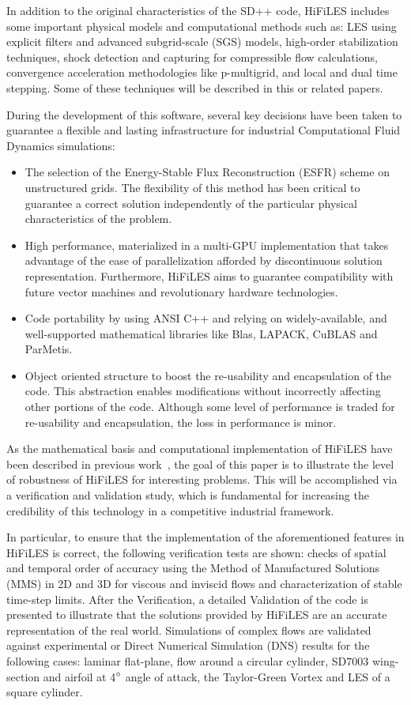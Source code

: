 In addition to the original characteristics of the SD++ code, HiFiLES includes some important physical models and computational methods such as: LES using explicit filters and advanced subgrid-scale (SGS) models, high-order stabilization techniques, shock detection and capturing for compressible flow calculations, convergence acceleration methodologies like p-multigrid, and local and dual time stepping. Some of these techniques will be described in this or related papers.

During the development of this software, several key decisions have been taken to guarantee a flexible and lasting infrastructure for industrial Computational Fluid Dynamics simulations:
\begin{itemize}
\item The selection of the Energy-Stable Flux Reconstruction (ESFR) scheme on unstructured grids. The flexibility of this method has been critical to guarantee a correct solution independently of the particular physical characteristics of the problem.
\item High performance, materialized in a multi-GPU implementation that takes advantage of the ease of parallelization afforded by discontinuous solution representation. Furthermore, HiFiLES aims to guarantee compatibility with future vector machines and revolutionary hardware technologies.
\item Code portability by using ANSI C++ and relying on widely-available, and well-supported mathematical libraries like Blas, LAPACK, CuBLAS and ParMetis.
\item Object oriented structure to boost the re-usability and encapsulation of the code. This abstraction enables modifications without incorrectly affecting other portions of the code. Although some level of performance is traded for re-usability and encapsulation, the loss in performance is minor.
\end{itemize}

As the mathematical basis and computational implementation of HiFiLES have been described in previous work~\cite{castonguay2011}, the goal of this paper is to illustrate the level of robustness of HiFiLES for interesting problems. This will be accomplished via a verification and validation study, which is fundamental for increasing the credibility of this technology in a competitive industrial framework.

In particular, to ensure that the implementation of the aforementioned features in HiFiLES is correct, the following verification tests are shown: checks of spatial and temporal order of accuracy using the Method of Manufactured Solutions (MMS) in 2D and 3D for viscous and inviscid flows and characterization of stable time-step limits. After the Verification, a detailed Validation of the code is presented to illustrate that the solutions provided by HiFiLES are an accurate representation of the real world. Simulations of complex flows are validated against experimental or Direct Numerical Simulation (DNS) results for the following cases: laminar flat-plane, flow around a circular cylinder, SD7003 wing-section and airfoil at 4$^{\circ}$ angle of attack, the Taylor-Green Vortex and LES of a square cylinder.

